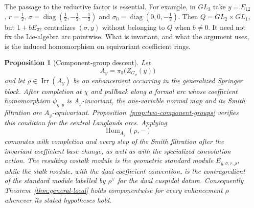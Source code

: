 \documentclass[10pt,a4paper]{amsart}
\newtheorem{proposition}[theorem]{Proposition}
\begin{document}
The passage to the reductive factor is essential.  For example, in
$GL_3$ take $y=E_{12}$, $r=\tfrac12$,
$\sigma=\operatorname{diag}(\tfrac12,-\tfrac12,-\tfrac12)$ and
$\sigma_0=\operatorname{diag}(0,0,-\tfrac12)$.  Then
$Q=GL_2\times GL_1$, but $1+bE_{32}$ centralizes $(\sigma,y)$
without belonging to $Q$ when $b\ne0$.  It need not fix the
Lie-algebra arc pointwise.  What is invariant, and what the argument
uses, is the induced homomorphism on equivariant coefficient rings.

\begin{proposition}[Component-group descent]
\label{prop:component-descent}
Let
\[
 A_y=\pi_0\bigl(Z_{G_\sigma}(y)\bigr)
\]
and let $\rho\in\operatorname{Irr}(A_y)$ be an enhancement occurring in the
generalized Springer block.  After completion at $\chi$ and pullback along a
formal arc whose coefficient homomorphism $\psi_{\eta,y}$ is
$A_y$-invariant, the
one-variable normal map and its Smith filtration are $A_y$-equivariant.
Proposition~\ref{prop:two-component-groups} verifies this condition for
the central Langlands arcs.  Applying
\[
 \operatorname{Hom}_{A_y}(\rho,-)
\]
commutes with completion and every step of the Smith filtration
after the invariant coefficient base change, as well as with the
specialized convolution action.  The resulting costalk module is the
geometric standard module $E_{y,\sigma,r,\rho}$, while the stalk module, with
the dual coefficient convention, is the contragredient of the standard
module labelled by $\rho^\vee$ for the dual cuspidal datum.  Consequently
Theorem~\ref{thm:general-local} holds componentwise for every enhancement
$\rho$ whenever its stated hypotheses hold.
\end{proposition}
\end{document}
